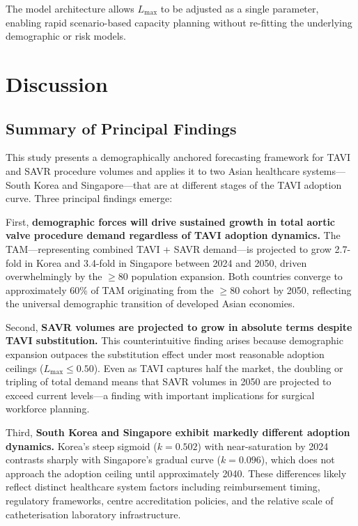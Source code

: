 \documentclass[12pt, a4paper]{article}
\begin{document}
The model architecture allows $L_{\max}$ to be adjusted as a single parameter, enabling rapid scenario-based capacity planning without re-fitting the underlying demographic or risk models.


\section{Discussion}

\subsection{Summary of Principal Findings}

This study presents a demographically anchored forecasting framework for TAVI and SAVR procedure volumes and applies it to two Asian healthcare systems---South Korea and Singapore---that are at different stages of the TAVI adoption curve. Three principal findings emerge:

First, \textbf{demographic forces will drive sustained growth in total aortic valve procedure demand regardless of TAVI adoption dynamics.} The TAM---representing combined TAVI + SAVR demand---is projected to grow 2.7-fold in Korea and 3.4-fold in Singapore between 2024 and 2050, driven overwhelmingly by the $\geq$80 population expansion. Both countries converge to approximately 60\% of TAM originating from the $\geq$80 cohort by 2050, reflecting the universal demographic transition of developed Asian economies.

Second, \textbf{SAVR volumes are projected to grow in absolute terms despite TAVI substitution.} This counterintuitive finding arises because demographic expansion outpaces the substitution effect under most reasonable adoption ceilings ($L_{\max} \leq 0.50$). Even as TAVI captures half the market, the doubling or tripling of total demand means that SAVR volumes in 2050 are projected to exceed current levels---a finding with important implications for surgical workforce planning.

Third, \textbf{South Korea and Singapore exhibit markedly different adoption dynamics.} Korea's steep sigmoid ($k = 0.502$) with near-saturation by 2024 contrasts sharply with Singapore's gradual curve ($k = 0.096$), which does not approach the adoption ceiling until approximately 2040. These differences likely reflect distinct healthcare system factors including reimbursement timing, regulatory frameworks, centre accreditation policies, and the relative scale of catheterisation laboratory infrastructure.
\end{document}
